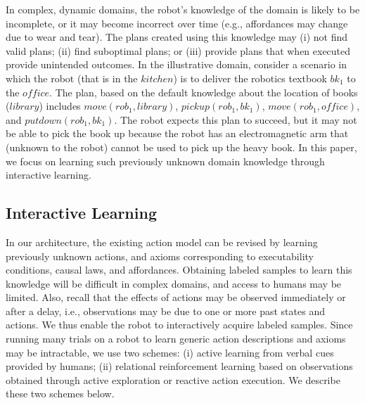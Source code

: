 \documentclass{article}
\newcounter{ctr}
\begin{document}
In complex, dynamic domains, the robot's knowledge of the domain is
likely to be incomplete, or it may become incorrect over time (e.g.,
affordances may change due to wear and tear). The plans created using
this knowledge may (i) not find valid plans; (ii) find suboptimal
plans; or (iii) provide plans that when executed provide unintended
outcomes. In the illustrative domain, consider a scenario in which the
robot (that is in the $kitchen$) is to deliver the robotics textbook
$bk_1$ to the $of\!\!fice$. The plan, based on the default knowledge
about the location of books ($library$) includes $move(rob_1,
library)$, $pickup(rob_1, bk_1)$, $move(rob_1, of\!\!fice)$, and
$putdown(rob_1, bk_1)$. The robot expects this plan to succeed, but it
may not be able to pick the book up because the robot has an
electromagnetic arm that (unknown to the robot) cannot be used to pick
up the heavy book. In this paper, we focus on learning such previously
unknown domain knowledge through interactive learning.


\subsection{Interactive Learning}
\label{sec:arch-learn}
In our architecture, the existing action model can be revised by
learning previously unknown actions, and axioms corresponding to
executability conditions, causal laws, and affordances. Obtaining
labeled samples to learn this knowledge will be difficult in complex
domains, and access to humans may be limited. Also, recall that the
effects of actions may be observed immediately or after a delay, i.e.,
observations may be due to one or more past states and actions.  We
thus enable the robot to interactively acquire labeled samples.  Since
running many trials on a robot to learn generic action descriptions
and axioms may be intractable, we use two schemes: (i) active learning
from verbal cues provided by humans; (ii) relational reinforcement
learning based on observations obtained through active exploration or
reactive action execution. We describe these two schemes below.
\end{document}
